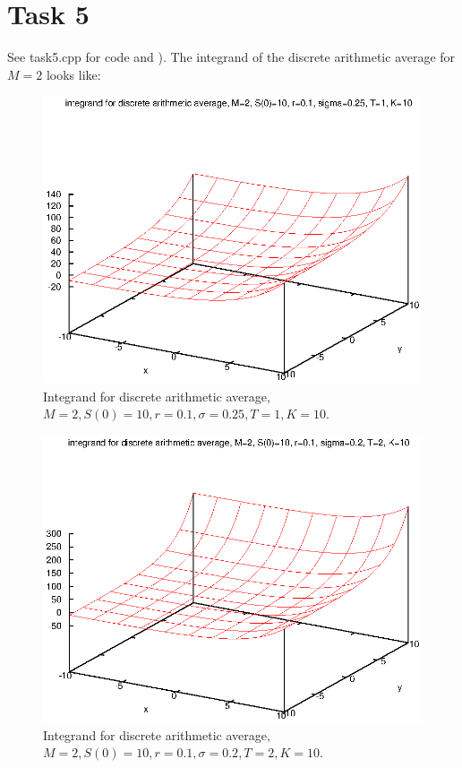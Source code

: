 \documentclass[]{article}
\begin{document}
\section*{Task 5} See task5.cpp for code and ). The
integrand of the discrete arithmetic average for $M=2$ looks like:
\begin{figure}[!ht]
\includegraphics{task5_1}
\caption{Integrand for discrete arithmetic average, $M=2, S(0)=10, r=0.1,
\sigma=0.25, T=1, K=10$.}
\label{fig:Task5a}
\end{figure}
\begin{figure}[!ht]
\includegraphics{task5_2}
\caption{Integrand for discrete arithmetic average, $M=2, S(0)=10, r=0.1,
\sigma=0.2, T=2, K=10$.}
\label{fig:Task5b}
\end{figure}
\clearpage
\end{document}
